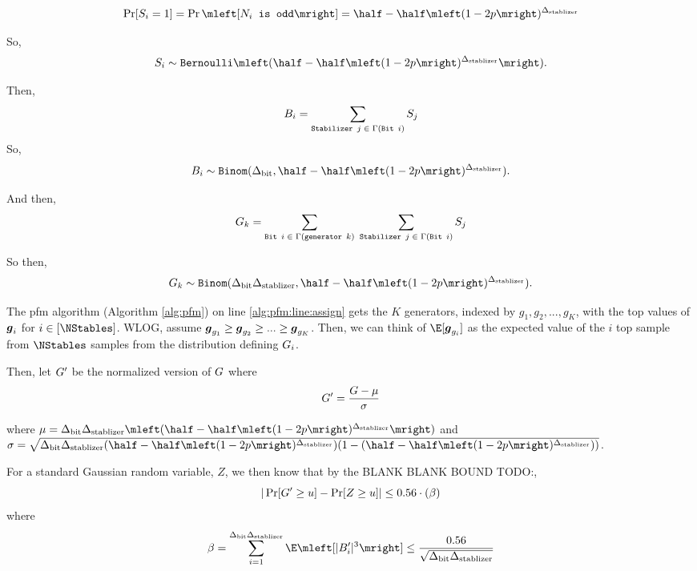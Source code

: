 \newcommand{\SPr}{\half - \half\mleft(1-2p\mright)^\DegStable}
\begin{align*}
	\Pr[S_i = 1] = \Pr\mleft[\texttt{$N_i$ is odd}\mright] = \SPr
\end{align*}

So,
$$
	\syndromeRV_i \sim \texttt{Bernoulli}\mleft(\SPr\mright).
$$

Then,
$$
	B_i = \sum_{\texttt{Stabilizer $j$} \; \in \; \Gamma(\texttt{Bit $i$})} S_j
$$
So, 
$$
	\bitscoreRV_i \sim \texttt{Binom}(\DegBit, \SPr).
$$

And then,
$$
	G_k =
		\sum_{\texttt{Bit $i$} \; \in \; \Gamma(\texttt{generator } k)}\;
			\sum_{\texttt{Stabilizer } j \; \in \; \Gamma(\texttt{Bit } i)}
				S_j
$$

So then,
$$
	\generatorscoreRV_k \sim \texttt{Binom}(\DegBit \DegStable, \SPr).
$$

The pfm algorithm (Algorithm \ref{alg:pfm}) on line \ref{alg:pfm:line:assign}
gets the $K$ generators, indexed by $g_1, g_2, ..., g_K$, with the top values
of $\boldsymbol{g}_i$ for $i \in [\NStables]$. WLOG, assume
$\boldsymbol{g}_{g_1} \geq \boldsymbol{g}_{g_2} \geq ... \geq \boldsymbol{g}_{g_K}$.
Then, we can think of $\E[\generatorscorevec_{g_i}]$ as the expected value of the $i$ 
top sample from $\NStables$ samples from the distribution defining $G_i$.

Then, let $G'$ be the normalized version of $G$ where
$$
	G' = \frac{G - \mu}{\sigma}
$$

\newcommand{\muexp}{\DegBit \DegStable \mleft(\SPr\mright)}
\newcommand{\sigmaexp}{ \sqrt{\DegBit \DegStable (\SPr) (1 - (\SPr))}}
where $\mu = \muexp$ and $\sigma = \sigmaexp$.

For a standard Gaussian random variable, $Z$, we then know that by the BLANK BLANK BOUND TODO:,
$$
	|\Pr[G' \geq u] - \Pr[Z \geq u]| \leq 0.56 \cdot (\beta)
$$
where
$$
	\beta =
		\sum_{i=1}^{\DegBit \DegStable} \E\mleft[|B'_i|^3\mright] \leq \frac{0.56}{\sqrt{\DegBit \DegStable}}
$$


